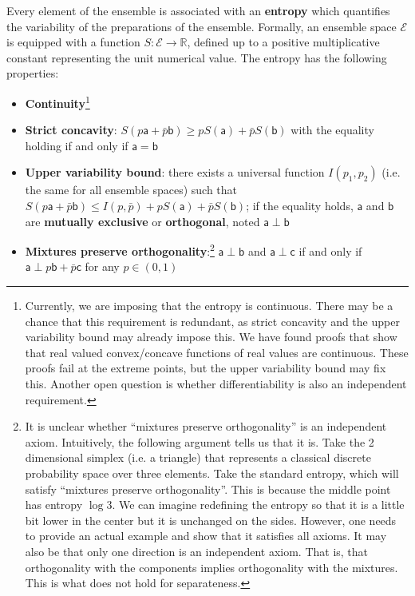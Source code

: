 \documentclass[10pt,twocolumn, nofootinbib]{revtex4-2}
\newcommand{\ens}[1][e] {\mathsf{#1}} %
\newcommand{\Ens}[1][E] {\mathcal{#1}} %
\def\ortho{\perp}
\begin{document}
\begin{axiom}
	Every element of the ensemble is associated with an \textbf{entropy} which quantifies the variability of the preparations of the ensemble. Formally, an ensemble space $\Ens$ is equipped with a function $S : \Ens \to \mathbb{R}$, defined up to a positive multiplicative constant representing the unit numerical value. The entropy has the following properties:
	\begin{itemize}
		\item \textbf{Continuity}\footnote{Currently, we are imposing that the entropy is continuous. There may be a chance that this requirement is redundant, as strict concavity and the upper variability bound may already impose this. We have found proofs that show that real valued convex/concave functions of real values are continuous. These proofs fail at the extreme points, but the upper variability bound may fix this. Another open question is whether differentiability is also an independent requirement.}
		\item \textbf{Strict concavity}: $S(p\ens[a] + \bar{p} \ens[b]) \geq p S(\ens[a]) + \bar{p} S(\ens[b])$ with the equality holding if and only if $\ens[a] = \ens[b]$
		\item \textbf{Upper variability bound}: there exists a universal function $I(p_1, p_2)$ (i.e. the same for all ensemble spaces) such that $S(p\ens[a] + \bar{p} \ens[b]) \leq I(p, \bar{p}) + p S(\ens[a]) + \bar{p} S(\ens[b])$; if the equality holds, $\ens[a]$ and $\ens[b]$ are \textbf{mutually exclusive} or \textbf{orthogonal}, noted $\ens[a] \ortho \ens[b]$
		\item \textbf{Mixtures preserve orthogonality}:\footnote{It is unclear whether ``mixtures preserve orthogonality'' is an independent axiom. Intuitively, the following argument tells us that it is. Take the 2 dimensional simplex (i.e. a triangle) that represents a classical discrete probability space over three elements. Take the standard entropy, which will satisfy ``mixtures preserve orthogonality''. This is because the middle point has entropy $\log 3$. We can imagine redefining the entropy so that it is a little bit lower in the center but it is unchanged on the sides. However, one needs to provide an actual example and show that it satisfies all axioms. It may also be that only one direction is an independent axiom. That is, that orthogonality with the components implies orthogonality with the mixtures. This is what does not hold for separateness.} $\ens[a] \ortho \ens[b]$ and $\ens[a] \ortho \ens[c]$ if and only if $\ens[a] \ortho p \ens[b] + \bar{p} \ens[c]$ for any $p \in (0,1)$
	\end{itemize}
\end{axiom}
\end{document}
